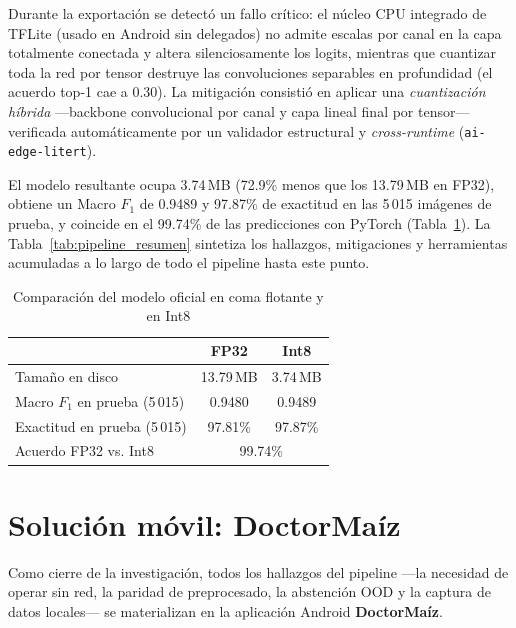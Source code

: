 \documentclass[conference,letterpaper]{IEEEtran}
\newcommand{\Fone}{$F_1$}
\begin{document}
Durante la exportación se detectó un fallo crítico: el núcleo CPU integrado de TFLite (usado en Android sin delegados) no admite escalas por canal en la capa totalmente conectada y altera silenciosamente los logits, mientras que cuantizar toda la red por tensor destruye las convoluciones separables en profundidad (el acuerdo top-1 cae a 0.30). La mitigación consistió en aplicar una \textit{cuantización híbrida} —backbone convolucional por canal y capa lineal final por tensor— verificada automáticamente por un validador estructural y \textit{cross-runtime} (\texttt{ai-edge-litert}).

El modelo resultante ocupa 3.74\,MB (72.9\% menos que los 13.79\,MB en FP32), obtiene un Macro \Fone{} de 0.9489 y 97.87\% de exactitud en las 5\,015 imágenes de prueba, y coincide en el 99.74\% de las predicciones con PyTorch (Tabla~\ref{tab:movil}). La Tabla~\ref{tab:pipeline_resumen} sintetiza los hallazgos, mitigaciones y herramientas acumuladas a lo largo de todo el pipeline hasta este punto.

\begin{table}[!t]
\caption{Comparación del modelo oficial en coma flotante y en Int8}
\label{tab:movil}
\centering
\scriptsize
\setlength{\tabcolsep}{4pt}
\begin{tabular}{@{}lcc@{}}
\toprule
& \textbf{FP32} & \textbf{Int8} \\
\midrule
Tamaño en disco & 13.79\,MB & 3.74\,MB \\
Macro \Fone{} en prueba (5\,015) & 0.9480 & 0.9489 \\
Exactitud en prueba (5\,015) & 97.81\% & 97.87\% \\
Acuerdo FP32 vs. Int8 & \multicolumn{2}{c}{99.74\%} \\
\bottomrule
\end{tabular}
\end{table}

\section{Solución móvil: DoctorMaíz}\label{sec:movil}

Como cierre de la investigación, todos los hallazgos del pipeline —la necesidad de operar sin red, la paridad de preprocesado, la abstención OOD y la captura de datos locales— se materializan en la aplicación Android \textbf{DoctorMaíz}.
\end{document}
